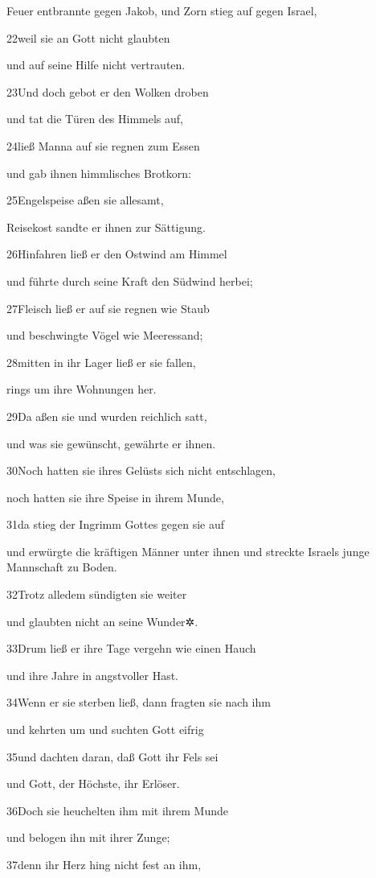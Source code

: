Feuer entbrannte gegen Jakob, und Zorn stieg auf gegen Israel,

22weil sie an Gott nicht glaubten

und auf seine Hilfe nicht vertrauten.

23Und doch gebot er den Wolken droben

und tat die Türen des Himmels auf,

24ließ Manna auf sie regnen zum Essen

und gab ihnen himmlisches Brotkorn:

25Engelspeise aßen sie allesamt,

Reisekost sandte er ihnen zur Sättigung.

26Hinfahren ließ er den Ostwind am Himmel

und führte durch seine Kraft den Südwind herbei;

27Fleisch ließ er auf sie regnen wie Staub

und beschwingte Vögel wie Meeressand;

28mitten in ihr Lager ließ er sie fallen,

rings um ihre Wohnungen her.

29Da aßen sie und wurden reichlich satt,

und was sie gewünscht, gewährte er ihnen.

30Noch hatten sie ihres Gelüsts sich nicht entschlagen,

noch hatten sie ihre Speise in ihrem Munde,

31da stieg der Ingrimm Gottes gegen sie auf

und erwürgte die kräftigen Männer unter ihnen und streckte Israels junge
Mannschaft zu Boden.

32Trotz alledem sündigten sie weiter

und glaubten nicht an seine Wunder✲.

33Drum ließ er ihre Tage vergehn wie einen Hauch

und ihre Jahre in angstvoller Hast.

34Wenn er sie sterben ließ, dann fragten sie nach ihm

und kehrten um und suchten Gott eifrig

35und dachten daran, daß Gott ihr Fels sei

und Gott, der Höchste, ihr Erlöser.

36Doch sie heuchelten ihm mit ihrem Munde

und belogen ihn mit ihrer Zunge;

37denn ihr Herz hing nicht fest an ihm,

